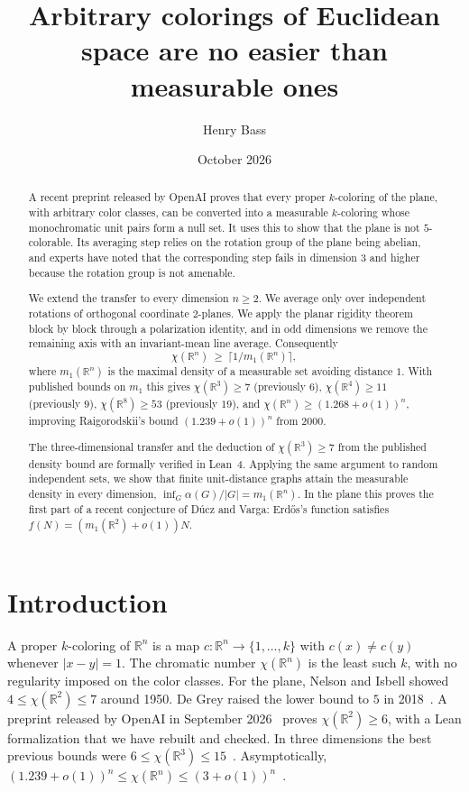 \documentclass[11pt]{amsart}
\title[Arbitrary and measurable colorings of Euclidean space]{Arbitrary colorings of Euclidean space are no easier than measurable ones}
\author{Henry Bass}
\date{October 2026}
\theoremstyle{definition}
\newcommand{\R}{\mathbb{R}}
\begin{document}
\begin{abstract}
A recent preprint released by OpenAI proves that every proper $k$-coloring of the plane, with arbitrary color classes, can be converted into a measurable $k$-coloring whose monochromatic unit pairs form a null set. It uses this to show that the plane is not $5$-colorable. Its averaging step relies on the rotation group of the plane being abelian, and experts have noted that the corresponding step fails in dimension $3$ and higher because the rotation group is not amenable.

We extend the transfer to every dimension $n\ge2$. We average only over independent rotations of orthogonal coordinate $2$-planes. We apply the planar rigidity theorem block by block through a polarization identity, and in odd dimensions we remove the remaining axis with an invariant-mean line average. Consequently
\[
\chi(\R^n)\ \ge\ \bigl\lceil 1/m_1(\R^n)\bigr\rceil ,
\]
where $m_1(\R^n)$ is the maximal density of a measurable set avoiding distance $1$. With published bounds on $m_1$ this gives $\chi(\R^3)\ge7$ (previously $6$), $\chi(\R^4)\ge 11$ (previously $9$), $\chi(\R^8)\ge53$ (previously $19$), and $\chi(\R^n)\ge(1.268+o(1))^n$, improving Raigorodskii's bound $(1.239+o(1))^n$ from 2000.

The three-dimensional transfer and the deduction of $\chi(\R^3)\ge7$ from the published density bound are formally verified in Lean~4. Applying the same argument to random independent sets, we show that finite unit-distance graphs attain the measurable density in every dimension, $\inf_G \alpha(G)/|G| = m_1(\R^n)$. In the plane this proves the first part of a recent conjecture of D\'ucz and Varga: Erd\H{o}s's function satisfies $f(N)=(m_1(\R^2)+o(1))N$.
\end{abstract}
\maketitle

\section{Introduction}

A proper $k$-coloring of $\R^n$ is a map $c\colon\R^n\to\{1,\dots,k\}$ with $c(x)\neq c(y)$ whenever $|x-y|=1$. The chromatic number $\chi(\R^n)$ is the least such $k$, with no regularity imposed on the color classes. For the plane, Nelson and Isbell showed $4\le\chi(\R^2)\le7$ around 1950. De Grey raised the lower bound to $5$ in 2018~\cite{deGrey}. A preprint released by OpenAI in September 2026~\cite{OAI} proves $\chi(\R^2)\ge6$, with a Lean formalization that we have rebuilt and checked. In three dimensions the best previous bounds were $6\le\chi(\R^3)\le15$~\cite{Nechushtan,Coulson,RT}. Asymptotically, $(1.239+o(1))^n\le\chi(\R^n)\le(3+o(1))^n$~\cite{Raigorodskii,LR}.
\end{document}
